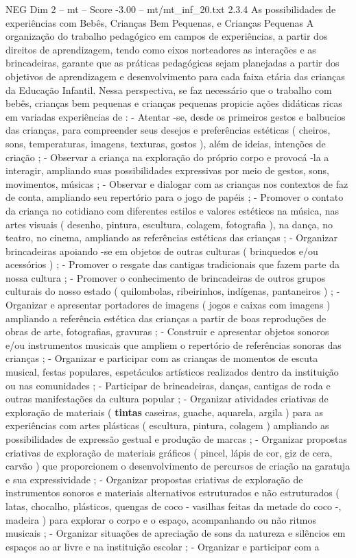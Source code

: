 \begin{textsample}{NEG Dim 2 – mt – Score -3.00 – mt/mt\_inf\_20.txt}  \label{ex:f2_neg_062}
2.3.4 As possibilidades de experiências com Bebês, Crianças Bem Pequenas, e Crianças Pequenas A organização do trabalho pedagógico em campos de experiências, a partir dos direitos de aprendizagem, tendo como eixos norteadores as interações e as brincadeiras, garante que as práticas pedagógicas sejam planejadas a partir dos objetivos de aprendizagem e desenvolvimento para cada faixa etária das crianças da Educação Infantil.
Nessa perspectiva, se faz necessário que o trabalho com bebês, crianças bem pequenas e crianças pequenas propicie ações didáticas ricas em variadas experiências de : - Atentar -se, desde os primeiros gestos e balbucios das crianças, para compreender seus desejos e preferências estéticas ( cheiros, sons, temperaturas, imagens, texturas, gostos ), além de ideias, intenções de criação ; - Observar a criança na exploração do próprio corpo e provocá -la a interagir, ampliando suas possibilidades expressivas por meio de gestos, sons, movimentos, músicas ; - Observar e dialogar com as crianças nos contextos de faz de conta, ampliando seu repertório para o jogo de papéis ; - Promover o contato da criança no cotidiano com diferentes estilos e valores estéticos na música, nas artes visuais ( desenho, pintura, escultura, colagem, fotografia ), na dança, no teatro, no cinema, ampliando as referências estéticas das crianças ; - Organizar brincadeiras apoiando -se em objetos de outras culturas ( brinquedos e/ou acessórios ) ; - Promover o resgate das cantigas tradicionais que fazem parte da nossa cultura ; - Promover o conhecimento de brincadeiras de outros grupos culturais do nosso estado ( quilombolas, ribeirinhos, indígenas, pantaneiros ) ; - Organizar e apresentar portadores de imagens ( jogos e caixas com imagens ) ampliando a referência estética das crianças a partir de boas reproduções de obras de arte, fotografias, gravuras ; - Construir e apresentar objetos sonoros e/ou instrumentos musicais que ampliem o repertório de referências sonoras das crianças ; - Organizar e participar com as crianças de momentos de escuta musical, festas populares, espetáculos artísticos realizados dentro da instituição ou nas comunidades ; - Participar de brincadeiras, danças, cantigas de roda e outras manifestações da cultura popular ; - Organizar atividades criativas de exploração de materiais ( \textbf{tintas} caseiras, guache, aquarela, argila ) para as experiências com artes plásticas ( escultura, pintura, colagem ) ampliando as possibilidades de expressão gestual e produção de marcas ; - Organizar propostas criativas de exploração de materiais gráficos ( pincel, lápis de cor, giz de cera, carvão ) que proporcionem o desenvolvimento de percursos de criação na garatuja e sua expressividade ; - Organizar propostas criativas de exploração de instrumentos sonoros e materiais alternativos estruturados e não estruturados ( latas, chocalho, plásticos, quengas de coco - vasilhas feitas da metade do coco -, madeira ) para explorar o corpo e o espaço, acompanhando ou não ritmos musicais ; - Organizar situações de apreciação de sons da natureza e silêncios em espaços ao ar livre e na instituição escolar ; - Organizar e participar com a 
\end{textsample}
